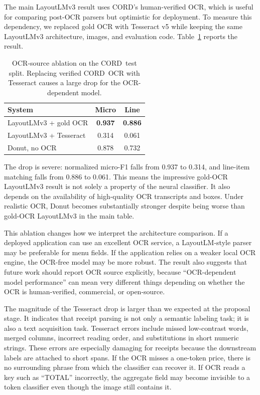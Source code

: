 \documentclass[9pt,twocolumn,twoside]{extarticle}
\newcommand{\cord}{\textsc{CORD}}
\begin{document}
The main LayoutLMv3 result uses \cord's human-verified OCR, which is useful for comparing post-OCR parsers but optimistic for deployment. To measure this dependency, we replaced gold OCR with Tesseract v5 while keeping the same LayoutLMv3 architecture, images, and evaluation code. Table~\ref{tab:ocr-ablation} reports the result.

\begin{table}[t]
\centering
\caption{OCR-source ablation on the \cord\ test split. Replacing verified \cord\ OCR with Tesseract causes a large drop for the OCR-dependent model.}
\label{tab:ocr-ablation}
\scriptsize
\begin{tabular}{@{}lcc@{}}
\toprule
\textbf{System} & \textbf{Micro} & \textbf{Line} \\
\midrule
LayoutLMv3 + gold OCR & \textbf{0.937} & \textbf{0.886} \\
LayoutLMv3 + Tesseract & 0.314 & 0.061 \\
Donut, no OCR & 0.878 & 0.732 \\
\bottomrule
\end{tabular}
\end{table}

The drop is severe: normalized micro-F1 falls from 0.937 to 0.314, and line-item matching falls from 0.886 to 0.061. This means the impressive gold-OCR LayoutLMv3 result is not solely a property of the neural classifier. It also depends on the availability of high-quality OCR transcripts and boxes. Under realistic OCR, Donut becomes substantially stronger despite being worse than gold-OCR LayoutLMv3 in the main table.

This ablation changes how we interpret the architecture comparison. If a deployed application can use an excellent OCR service, a LayoutLM-style parser may be preferable for menu fields. If the application relies on a weaker local OCR engine, the OCR-free model may be more robust. The result also suggests that future work should report OCR source explicitly, because ``OCR-dependent model performance'' can mean very different things depending on whether the OCR is human-verified, commercial, or open-source.

The magnitude of the Tesseract drop is larger than we expected at the proposal stage. It indicates that receipt parsing is not only a semantic labeling task; it is also a text acquisition task. Tesseract errors include missed low-contrast words, merged columns, incorrect reading order, and substitutions in short numeric strings. These errors are especially damaging for receipts because the downstream labels are attached to short spans. If the OCR misses a one-token price, there is no surrounding phrase from which the classifier can recover it. If OCR reads a key such as ``TOTAL'' incorrectly, the aggregate field may become invisible to a token classifier even though the image still contains it.
\end{document}
